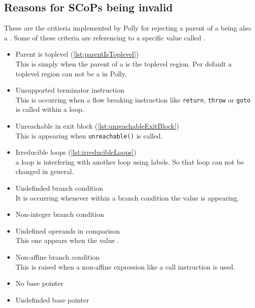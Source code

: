 \subsection{Reasons for SCoPs being invalid}
These are the critieria implemented by Polly for rejecting a parent of a \scop being also a \scop.
Some of these criteria are referencing to a \llvm specific value called \undefv.\cite{llvmUndef}
\begin{itemize}
    \item Parent is toplevel (\autoref{lst:parentIsToplevel})\\
        This is simply when the parent of a \scop is the toplevel region.
        Per default a toplevel region can not be a \scop in Polly.
    \item Unsupported terminator instruction\\
        This is occurring when a flow breaking instruction like \texttt{return}, \texttt{throw} or \texttt{goto} is called within a loop.
    \item Unreachable in exit block (\autoref{lst:unreachableExitBlock})\\
        This is appearing when \texttt{unreachable()} is called.\cite{llvmUnreachable}
    \item Irreducible loops (\autoref{lst:irreducibleLoops})\\
        \Eg a loop is interfering with another loop using labels.
        So that loop can not be changed in general.
    \item Undefinded branch condition\\
        It is occurring whenever within a branch condition the value \undefv is appearing.
    \item Non-integer branch condition\\
    \item Undefined operands in comparison\\
        This one appears when the value \undefv.
    \item Non-affine branch condition\\
        This is raised when a non-affine expression like a call instruction is used.
    \item No base pointer\\
    \item Undefinded base pointer\\

\end{itemize}
